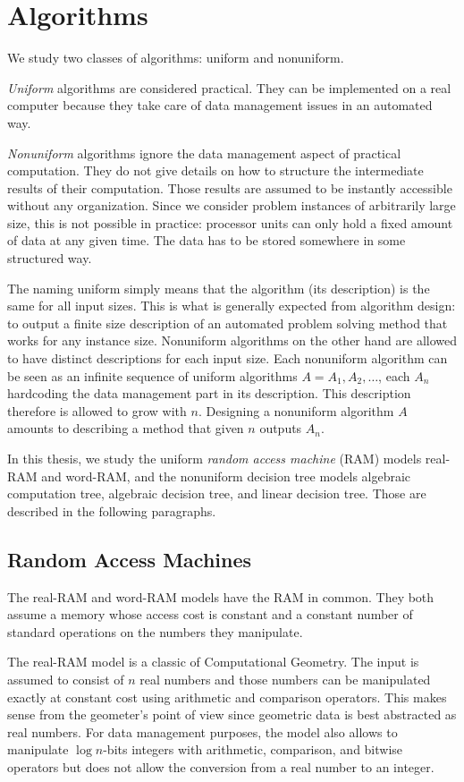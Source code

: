 \section{Algorithms}

We study two classes of algorithms: uniform and nonuniform.

\emph{Uniform} algorithms are considered practical. They can be implemented on
a real computer because they take care of data management issues in an
automated way.

\emph{Nonuniform} algorithms ignore the data management aspect of practical
computation. They do not give details on how to structure the intermediate
results of their computation. Those results are assumed to be instantly
accessible without any organization. Since we consider problem instances of
arbitrarily large size, this is not possible in practice:
processor units can only hold a fixed amount of data at any given time. The
data has to be stored somewhere in some structured way.

The naming uniform simply means that the algorithm (its description) is the
same for all input sizes. This is what is generally expected from algorithm
design: to output a finite size description of an automated problem solving
method that works for any instance size.
%
Nonuniform algorithms on the other hand are allowed to have distinct
descriptions for each input size. Each nonuniform algorithm can be seen as an
infinite sequence of uniform algorithms \(A = A_1, A_2, \ldots\), each \(A_n\)
hardcoding the data management part in its description. This description
therefore is allowed to grow with \(n\).
Designing a nonuniform algorithm \(A\) amounts to describing a method
that given \(n\) outputs \(A_n\).

In this thesis, we study the uniform \emph{random access machine} (RAM) models
real-RAM and word-RAM, and the nonuniform decision tree models algebraic
computation tree, algebraic decision tree, and linear decision tree. Those are
described in the following paragraphs.

\subsection{Random Access Machines}

The real-RAM and word-RAM models have the RAM in common. They both assume
a memory whose access cost is constant and a constant number of standard
operations on the numbers they manipulate.

The real-RAM model is a classic of Computational Geometry. The input is assumed
to consist of \(n\) real numbers and those numbers can be manipulated
exactly at constant cost using arithmetic and comparison operators.
This makes sense from the geometer's point of view since geometric data is
best abstracted as real numbers.
For data management purposes, the model also allows to manipulate \(\log
n\)-bits integers with arithmetic, comparison, and bitwise operators but does
not allow the conversion from a real number to an integer.

